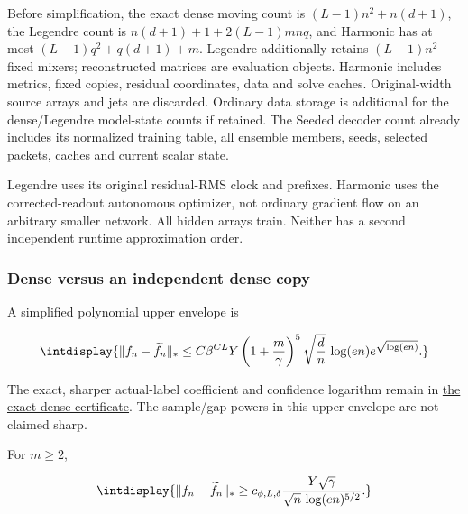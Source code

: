 
Before simplification, the exact dense moving count is \((L-1)n^2+n(d+1)\), the Legendre count is \(n(d+1)+1+2(L-1)mnq\), and Harmonic has at most \((L-1)q^2+q(d+1)+m\). Legendre additionally retains \((L-1)n^2\) fixed mixers; reconstructed matrices are evaluation objects. Harmonic includes metrics, fixed copies, residual coordinates, data and solve caches. Original-width source arrays and jets are discarded. Ordinary data storage is additional for the dense/Legendre model-state counts if retained. The Seeded decoder count already includes its normalized training table, all ensemble members, seeds, selected packets, caches and current scalar state.



Legendre uses its original residual-RMS clock and prefixes. Harmonic uses the corrected-readout autonomous optimizer, not ordinary gradient flow on an arbitrary smaller network. All hidden arrays train. Neither has a second independent runtime approximation order.


\subsubsection{Dense versus an independent dense copy}



A simplified polynomial upper envelope is


\begingroup\renewcommand{\theHequation}{intdisplay.6}
\begin{equation}
\intdisplay{
\|f_n-\widetilde f_n\|_*
\le C\beta^{CL}Y\left(1+\frac m\gamma\right)^5
\sqrt{\frac dn}\,\log(en)e^{\sqrt{\log(en)}}.
}
\label{int:eq-0003-dense-upper}
\end{equation}
\endgroup


The exact, sharper actual-label coefficient and confidence logarithm remain in \hyperref[int:dense-forward-comparison]{the exact dense certificate}. The sample/gap powers in this upper envelope are not claimed sharp.



For \(m\ge2\),


\begingroup\renewcommand{\theHequation}{intdisplay.7}
\begin{equation}
\intdisplay{
\|f_n-\widetilde f_n\|_*
\ge c_{\phi,L,\delta}\frac{Y\sqrt\gamma}
{\sqrt n\,\log(en)^{5/2}}.
}
\label{int:eq-0004-dense-lower}
\end{equation}
\endgroup

